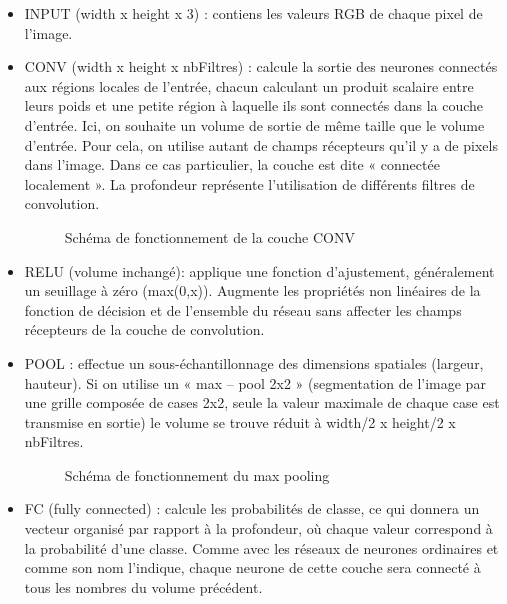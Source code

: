 \documentclass[debug,nodate,hideweeklyreports]{polytech/polytech}
\begin{document}
 \begin{itemize}
\item INPUT (width x height x 3) : contiens les valeurs RGB de chaque pixel de l’image.
\item CONV (width x height x nbFiltres) : calcule la sortie des neurones connectés aux régions locales de l'entrée, chacun calculant un produit scalaire entre leurs poids et une petite région à laquelle ils sont connectés dans la couche d'entrée. Ici, on souhaite un volume de sortie de même taille que le volume d'entrée. Pour cela, on utilise autant de champs récepteurs qu’il y a de pixels dans l’image. Dans ce cas particulier, la couche est dite « connectée localement ». La profondeur représente l’utilisation de différents filtres de convolution.

\begin{figure}
  \caption{Schéma de fonctionnement de la couche CONV}
  \label{fig:cnnconvlayers}
\end{figure}

\item RELU (volume inchangé): applique une fonction d’ajustement, généralement un seuillage à zéro (max(0,x)). Augmente les propriétés non linéaires de la fonction de décision et de l'ensemble du réseau sans affecter les champs récepteurs de la couche de convolution.
\item POOL : effectue un sous-échantillonnage des dimensions spatiales (largeur, hauteur). Si on utilise un « max – pool 2x2 » (segmentation de l’image par une grille composée de cases 2x2, seule la valeur maximale de chaque case est transmise en sortie) le volume se trouve réduit à width/2 x height/2 x nbFiltres.

\begin{figure}
  \caption{Schéma de fonctionnement du max pooling}
  \label{fig:cnnmaxpooling}
\end{figure}

\item FC (fully connected) : calcule les probabilités de classe, ce qui donnera un vecteur organisé par rapport à la profondeur, où chaque valeur correspond à la probabilité d’une classe. Comme avec les réseaux de neurones ordinaires et comme son nom l'indique, chaque neurone de cette couche sera connecté à tous les nombres du volume précédent.
\end{itemize}
\end{document}
